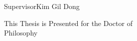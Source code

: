 


\newcommand{\innerSupervisorLabel}{Supervisor}
\newcommand{\ThesisSupervisorName}{Kim Gil Dong}

\newcommand{\innerPresentedLine}{This Thesis is Presented for the Doctor of\\
	Philosophy}
	



\begin{titlepage}
	\thispagestyle{empty}
	
	\begin{center}
		
		\vspace*{0.3cm}
		
		{\fontsize{20pt}{24pt}\selectfont \ThesisTitle\par}
		
		\vspace{1.8cm}
		
		{\fontsize{12pt}{14pt}\selectfont
			\innerSupervisorLabel\hspace{1.5em}\ThesisSupervisorName\par}
		
		\vspace{0.6cm}
		
		{\fontsize{14pt}{18pt}\selectfont \innerPresentedLine\par}
		
		\vspace{1.8cm}
		
		{\fontsize{12pt}{14pt}\selectfont \ThesisDate\par}
		
		\vspace{1.0cm}
		
		{\fontsize{12pt}{14pt}\selectfont
			\ThesisSchool\par
			\ThesisUniversity\par}
		
		\vspace{1.0cm}
		{\fontsize{12pt}{14pt}\selectfont \ThesisDepartment\par}
		
		\vspace{1.0cm}
		{\fontsize{14pt}{16pt}\selectfont \ThesisAuthor\par}
		
		\vfill
	\end{center}
\end{titlepage}


